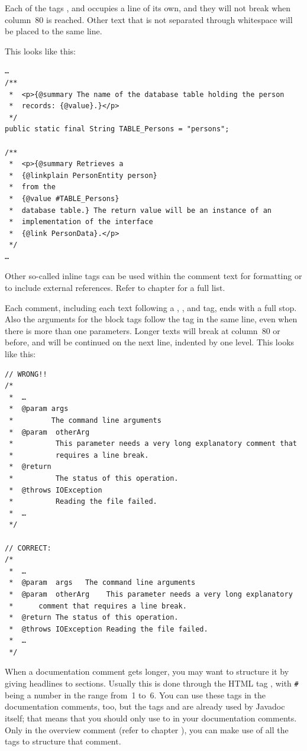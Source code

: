 Each of the tags ,  and  occupies a line of its own, and they will not break when column~80 is reached. Other text that is not separated through whitespace will be placed to the same line.

This looks like this:
\begin{lstlisting}
…
/**
 *  <p>{@summary The name of the database table holding the person 
 *  records: {@value}.}</p>
 */
public static final String TABLE_Persons = "persons";

/**
 *  <p>{@summary Retrieves a
 *  {@linkplain PersonEntity person}
 *  from the
 *  {@value #TABLE_Persons} 
 *  database table.} The return value will be an instance of an
 *  implementation of the interface
 *  {@link PersonData}.</p>
 */
…
\end{lstlisting}

Other so-called inline tags can be used within the comment text for formatting or to include external references. Refer to chapter  for a full list.

Each comment, including each text following a , , and  tag, ends with a full stop. Also the arguments for the block tags follow the tag in the same line, even when there is more than one parameters. Longer texts will break at column~80 or before, and will be continued on the next line, indented by one level. 
This looks like this:
\begin{lstlisting}
// WRONG!!
/*
 *  …
 *  @param args
 *         The command line arguments
 *  @param  otherArg
 *          This parameter needs a very long explanatory comment that
 *          requires a line break.
 *  @return
 *          The status of this operation.  
 *  @throws IOException
 *          Reading the file failed.
 *  …
 */

// CORRECT:
/*
 *  …
 *  @param  args   The command line arguments
 *  @param  otherArg    This parameter needs a very long explanatory
 *      comment that requires a line break.
 *  @return The status of this operation.  
 *  @throws IOException Reading the file failed.
 *  …
 */
\end{lstlisting}

When a documentation comment gets longer, you may want to structure it by giving headlines to sections. Usually this is done through the HTML tag , with \verb|#| being a number in the range from~1 to~6. You can use these tags in the documentation comments, too, but the tags  and  are already used by Javadoc itself; that means that you should only use  to  in your documentation comments. Only in the overview comment (refer to chapter ), you can make use of all the  tags to structure that comment.

